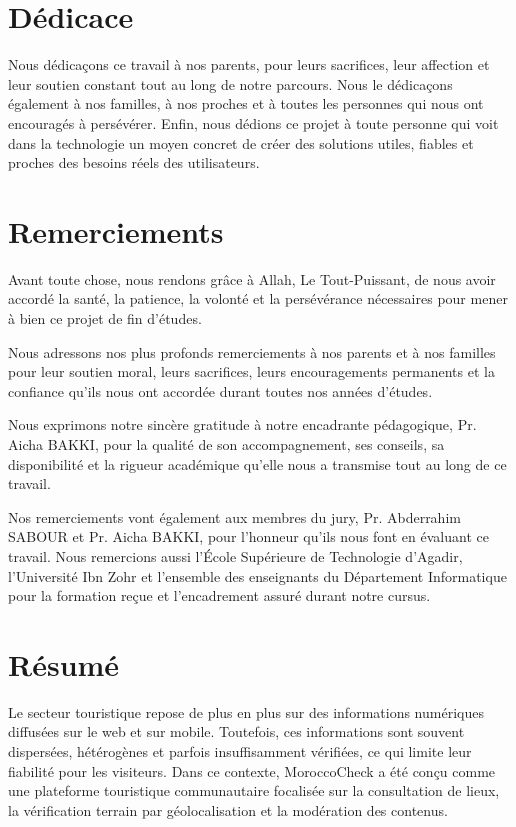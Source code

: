 ﻿\documentclass[12pt,a4paper]{report}
\begin{document}

\chapter*{D\'edicace}
Nous d\'edica\c{c}ons ce travail \`a nos parents, pour leurs sacrifices, leur affection et leur soutien constant tout au long de notre parcours. Nous le d\'edica\c{c}ons \'egalement \`a nos familles, \`a nos proches et \`a toutes les personnes qui nous ont encourag\'es \`a pers\'ev\'erer. Enfin, nous d\'edions ce projet \`a toute personne qui voit dans la technologie un moyen concret de cr\'eer des solutions utiles, fiables et proches des besoins r\'eels des utilisateurs.

\clearpage
\chapter*{Remerciements}
Avant toute chose, nous rendons gr\^ace \`a Allah, Le Tout-Puissant, de nous avoir accord\'e la sant\'e, la patience, la volont\'e et la pers\'ev\'erance n\'ecessaires pour mener \`a bien ce projet de fin d'\'etudes.

Nous adressons nos plus profonds remerciements \`a nos parents et \`a nos familles pour leur soutien moral, leurs sacrifices, leurs encouragements permanents et la confiance qu'ils nous ont accord\'ee durant toutes nos ann\'ees d'\'etudes.

Nous exprimons notre sinc\`ere gratitude \`a notre encadrante p\'edagogique, Pr. Aicha BAKKI, pour la qualit\'e de son accompagnement, ses conseils, sa disponibilit\'e et la rigueur acad\'emique qu'elle nous a transmise tout au long de ce travail.

Nos remerciements vont \'egalement aux membres du jury, Pr. Abderrahim SABOUR et Pr. Aicha BAKKI, pour l'honneur qu'ils nous font en \'evaluant ce travail. Nous remercions aussi l'\'Ecole Sup\'erieure de Technologie d'Agadir, l'Universit\'e Ibn Zohr et l'ensemble des enseignants du D\'epartement Informatique pour la formation re\c{c}ue et l'encadrement assur\'e durant notre cursus.

\clearpage
\chapter*{R\'esum\'e}
Le secteur touristique repose de plus en plus sur des informations num\'eriques diffus\'ees sur le web et sur mobile. Toutefois, ces informations sont souvent dispers\'ees, h\'et\'erog\`enes et parfois insuffisamment v\'erifi\'ees, ce qui limite leur fiabilit\'e pour les visiteurs. Dans ce contexte, MoroccoCheck a \'et\'e con\c{c}u comme une plateforme touristique communautaire focalis\'ee sur la consultation de lieux, la v\'erification terrain par g\'eolocalisation et la mod\'eration des contenus.
\end{document}
